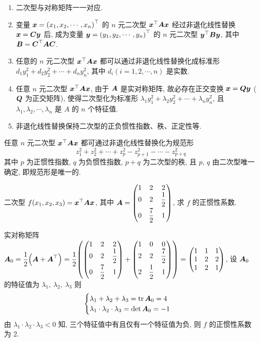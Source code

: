 \begin{enumerate}[label=(\arabic{*})]
    \item 二次型与对称矩阵一一对应.
    \item 变量 $ \vb*{x}=\left(x_{1}, x_{2}, \cdots, x_{n}\right)^{\top} $ 的 $ n $ 元二次型 $ \vb*{x}^{\top} \vb*{A} \vb*{x} $ 经过非退化线性替换 $ \vb*{x}=\vb*{C} \vb*{y} $ 后, 成为变量 $ \vb*{y}=\left(y_{1}, y_{2}, \cdots, y_{n}\right)^{\top} $ 的 $ n $ 元二次型 $ \vb*{y}^{\top} \vb*{B} \vb*{y} $, 其中 $ \vb*{B}=\vb*{C}^{\top} \vb*{A} \vb*{C} $.
    \item 任意的 $ n $ 元二次型 $ \vb*{x}^{\top} \vb*{A} \vb*{x} $ 都可以通过非退化线性替换化成标准形 $ d_{1} y_{1}^{2}+   d_{2} y_{2}^{2}+\cdots+d_{n} y_{n}^{2} $, 其中 $ d_{i}(i=1,2, \cdots, n) $ 是实数.
    \item 任意 $ n $ 元二次型 $ \vb*{x}^{\top} \vb*{A} \vb*{x} $, 由于 $ \vb*{A} $ 是实对称矩阵, 故必存在正交变换 $ \vb*{x}=\vb*{Q} \vb*{y}$ ($\vb*{Q} $ 为正交矩阵), 使得二次型化为标准形 $ \lambda_{1} y_{1}^{2}+\lambda_{2} y_{2}^{2}+\cdots+\lambda_{n} y_{n}^{2} $, 且 $ \lambda_{1}, \lambda_{2}, \cdots, \lambda_{n} $ 是 $ A $ 的 $ n $ 个特征值.
    \item 非退化线性替换保持二次型的正负惯性指数、秩、正定性等.
\end{enumerate}

\begin{theorem}[惯性定理]
    任意 $n$ 元二次型 $\vb*{x}^\top\vb*{Ax}$ 都可通过非退化线性替换化为规范形
    $$z_1^2+z_2^2+\cdots+z_p^2-z_{p+1}^2-\cdots-z_{p+q}^2$$
    其中 $p$ 为正惯性指数, $q$ 为负惯性指数, $p+q$ 为二次型的秩, 且 $p$, $q$ 由二次型唯一确定, 即规范形是唯一的.
\end{theorem}

\begin{example}
    二次型 $f(x_1,x_2,x_3)=\vb*{x}^\top\vb*{Ax}$, 其中 $\vb*{A}=\mqty(1&2&2\\0&2&\dfrac{1}{2}\\[6pt]0&\dfrac{7}{2}&1)$, 求 $f$ 的正惯性系数.
\end{example}
\begin{solution}
    实对称矩阵 $\vb*{A}_0=\dfrac{1}{2}\qty(\vb*{A}+\vb*{A}^\top)=\dfrac{1}{2}\qty(\mqty(1&2&2\\0&2&\dfrac{1}{2}\\[6pt]0&\dfrac{7}{2}&1)+\mqty(1&0&0\\2&2&\dfrac{7}{2}\\[6pt]2&\dfrac{1}{2}&1))=\mqty(1&1&1\\1&2&2\\1&2&1)$, 
    设 $\vb*{A}_0$ 的特征值为 $\lambda_1,~\lambda_2,~\lambda_3$ 则 $$\begin{cases}
            \lambda_1+\lambda_2+\lambda_3=\tr\vb*{A}_0=4 \\
            \lambda_1\cdot \lambda_2\cdot \lambda_3=\det\vb*{A}_0=-1
        \end{cases}$$ 由 $\lambda_1\cdot \lambda_2\cdot \lambda_3<0$ 知, 三个特征值中有且仅有一个特征值为负, 则 $f$ 的正惯性系数为 2.
\end{solution}

